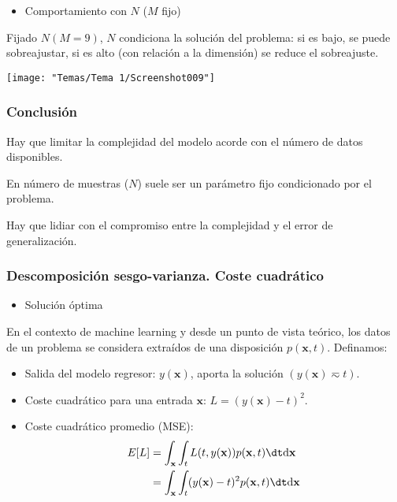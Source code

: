\begin{minipage}{0.4\textwidth}
	\begin{itemize}[label=\color{red}\textbullet, leftmargin=*]
		\item \color{lightblue}Comportamiento con $N$ ($M$ fijo)
	\end{itemize}
	Fijado $N(M=9)$, $N$ condiciona la solución del problema: si es bajo, se puede sobreajustar, si es alto (con relación a la dimensión) se reduce el sobreajuste.
\end{minipage}\qquad\begin{minipage}{0.4\textwidth}
	\begin{center}
		\texttt{[image: "Temas/Tema 1/Screenshot009"]}
	\end{center}
\end{minipage}
\subsubsection{Conclusión}
Hay que limitar la complejidad del modelo acorde con el número de datos disponibles.

En número de muestras ($N$) suele ser un parámetro fijo condicionado por el problema.

Hay que lidiar con el compromiso entre la complejidad y el error de generalización.

\subsubsection{Descomposición sesgo-varianza. Coste cuadrático}
\begin{itemize}[label=\color{red}\textbullet, leftmargin=*]
	\item \color{lightblue}Solución óptima
\end{itemize}
En el contexto de machine learning y desde un punto de vista teórico, los datos de un problema se considera extraídos de una disposición $p(\mathbf{x},t)$. Definamos: 
\begin{itemize}
	\item Salida del modelo regresor: $y(\mathbf{x})$, aporta la solución $(y(\mathbf{x})\eqsim t)$.
	\item Coste cuadrático para una entrada $\mathbf{x}$: $L=(y(\mathbf{x})-t)^2$.
	\item Coste cuadrático promedio (MSE): \begin{align}
		E[L]&=\int_\mathbf{x}\int_t L(t,y(\mathbf{x}))p(\mathbf{x},t)\dt\mathrm{d}\mathbf{x}\\
		&=\int_\mathbf{x}\int_t(y(\mathbf{x})-t)^2p(\mathbf{x},t)\dt\mathrm{d}\mathbf{x}
	\end{align}
\end{itemize}

